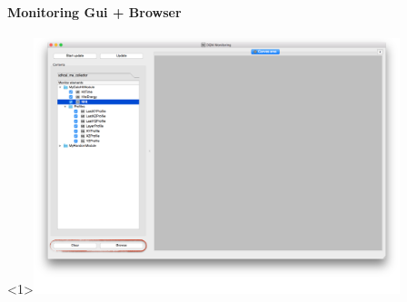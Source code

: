 \documentclass[8pt]{beamer}
\begin{document}
 \begin{frame}
    \frametitle{\secname}
    \framesubtitle{ Monitoring Gui + Browser }

    \begin{overlayarea}{\textwidth}{\textheight}
    	       \begin{center}

        \begin{onlyenv}<1>\includegraphics[width=0.8\textwidth]{figs/MonitoringGui/MG_Browse.png}\end{onlyenv}
                       \end{center}

       \begin{columns}

	 \vspace{-3em}


\end{columns}
\end{overlayarea}
\end{frame}
\end{document}
